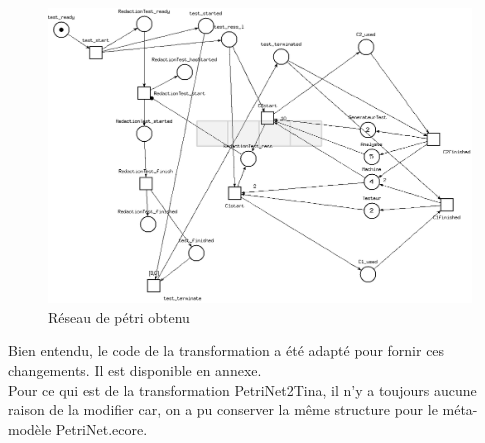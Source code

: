 \begin{figure}[!h] 
\begin{center}
\includegraphics[width=15cm]{Capture-16.png}
\caption{Réseau de pétri obtenu} 
\label{img1} 
\end{center}
\end{figure}

Bien entendu, le code de la transformation a été adapté pour fornir ces changements. Il est disponible en annexe.\\

Pour ce qui est de la transformation PetriNet2Tina, il n'y a toujours aucune raison de la modifier car, on a pu conserver la même structure pour le méta-modèle PetriNet.ecore.\\







